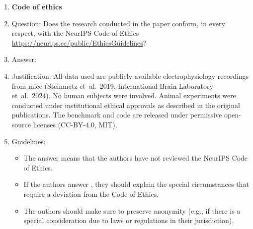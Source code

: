 \begin{enumerate}
\item {\bf Code of ethics}
    \item[] Question: Does the research conducted in the paper conform, in every respect, with the NeurIPS Code of Ethics \url{https://neurips.cc/public/EthicsGuidelines}?
    \item[] Answer: \answerYes{}
    \item[] Justification: All data used are publicly available
      electrophysiology recordings from mice (Steinmetz et~al.\ 2019,
      International Brain Laboratory et~al.\ 2024).  No human subjects
      were involved.  Animal experiments were conducted under
      institutional ethical approvals as described in the original
      publications.  The benchmark and code are released under
      permissive open-source licenses (CC-BY-4.0, MIT).
    \item[] Guidelines:
    \begin{itemize}
        \item The answer \answerNA{} means that the authors have not reviewed the NeurIPS Code of Ethics.
        \item If the authors answer \answerNo, they should explain the special circumstances that require a deviation from the Code of Ethics.
        \item The authors should make sure to preserve anonymity (e.g., if there is a special consideration due to laws or regulations in their jurisdiction).
    \end{itemize}



\end{enumerate}
